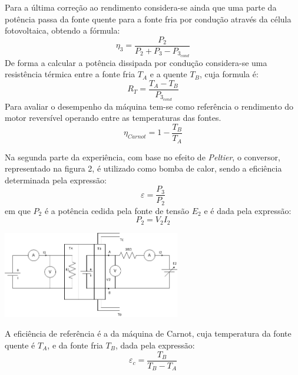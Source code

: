 \documentclass[9pt]{extarticle}
\begin{document}
\begin{multicols}{2}
\par Para a última correção ao rendimento considera-se ainda que uma parte da potência passa da fonte quente para a fonte fria por condução através da célula fotovoltaica, obtendo a fórmula:
\begin{equation} \label{n3}
\eta_3=\frac{P_2}{P_2+P_3-P_{3_{cond}}}
\end{equation}
De forma a calcular a potência dissipada por condução considera-se uma resistência térmica entre a fonte fria $T_A$ e a quente $T_B$, cuja formula é:
\begin{equation} \label{Rt}
R_T = \frac{T_A - T_B}{P_{3_{cond}}}
\end{equation}
Para avaliar o desempenho da máquina tem-se como referência o rendimento do motor reversível operando entre as temperaturas das fontes.
\begin{equation} \label{Nc}
\eta_{Carnot} = 1 - \frac{T_B}{T_A}
\end{equation}

Na segunda parte da experiência, com base no efeito de \textit{Peltier}, o conversor, representado na figura 2, é utilizado como bomba de calor, sendo a eficiência determinada pela expressão:
\begin{equation} \label{e}
\varepsilon=\frac{P_3}{P_2}
\end{equation}
em que $P_2$ é a potência cedida pela fonte de tensão $E_2$ e é dada pela expressão:
\begin{equation}
P_2= V_2 I_2
\end{equation}

\hspace{-0.8cm}
\begin{center}
\includegraphics[width=220pt]{figura2.png}
\begin{center}
\par{}
\end{center}
\end{center}

A eficiência de referência é a da máquina de Carnot, cuja temperatura da fonte quente é $T_A$, e da fonte fria $T_B$, dada pela expressão:
\begin{equation} \label{ec}
\varepsilon_c = \frac{T_B}{T_B - T_A}
\end{equation}























\end{multicols}
\end{document}
